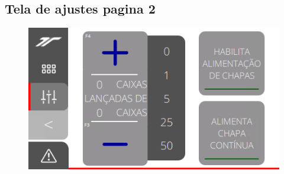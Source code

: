 \newpage
\thispagestyle{fancy}
\vspace*{40 pt}
\subsection{\small{Tela de ajustes pagina 2}}
\vspace*{\fill}
\begin{figure}[h]
  \centering
  \includegraphics{src/imagesFlexo/12-IHMCNT/e-5.png}
\end{figure}
\vspace*{\fill}


